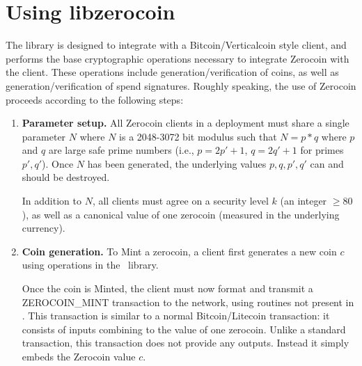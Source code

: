 \section{Using libzerocoin}

The \libzerocoin library is designed to integrate with a Bitcoin/Verticalcoin style client, and performs the base cryptographic operations necessary to integrate Zerocoin with the client. These operations include generation/verification of coins, as well as generation/verification of spend signatures. Roughly speaking, the use of Zerocoin proceeds according to the following steps:

\begin{enumerate}
\item {\bf Parameter setup.} All Zerocoin clients in a deployment must share a single parameter $N$ where $N$ is a 2048-3072 bit modulus such that $N = p*q$ where $p$ and $q$ are large safe prime numbers (i.e., $p = 2p'+1$, $q = 2q'+1$ for primes $p', q'$). Once $N$ has been generated, the underlying values $p, q, p', q'$ can and should be destroyed.

In addition to $N$, all clients must agree on a security level $k$ (an integer $\ge 80$), as well as a canonical value of one zerocoin (measured in the underlying currency).

\item {\bf Coin generation.} To Mint a zerocoin, a client first generates a new coin $c$ using operations in the \libzerocoin~library.

Once the coin is Minted, the client must now format and transmit a \textsf{ZEROCOIN\_MINT} transaction to the network, using routines not present in \libzerocoin. This transaction is similar to a normal Bitcoin/Litecoin transaction: it consists of inputs combining to the value of one zerocoin. Unlike a standard transaction, this transaction does not provide any outputs. Instead it simply embeds the Zerocoin value $c$.

\end{enumerate}
